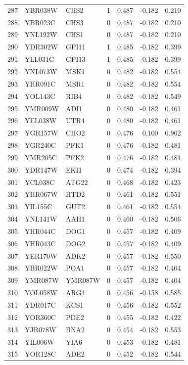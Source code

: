 \begin{longtable}{rllrrrr}
287 & YBR038W & CHS2 & 1 & 0.487 & -0.182 & 0.210\\
288 & YBR023C & CHS3 & 0 & 0.487 & -0.182 & 0.210\\
289 & YNL192W & CHS1 & 0 & 0.487 & -0.182 & 0.210\\
290 & YDR302W & GPI11 & 1 & 0.485 & -0.182 & 0.399\\
291 & YLL031C & GPI13 & 1 & 0.485 & -0.182 & 0.399\\
292 & YNL073W & MSK1 & 0 & 0.482 & -0.182 & 0.554\\
293 & YHR091C & MSR1 & 0 & 0.482 & -0.182 & 0.554\\
294 & YOL143C & RIB4 & 0 & 0.482 & -0.182 & 0.549\\
295 & YMR009W & ADI1 & 0 & 0.480 & -0.182 & 0.461\\
296 & YEL038W & UTR4 & 0 & 0.480 & -0.182 & 0.461\\
297 & YGR157W & CHO2 & 0 & 0.476 & 0.100 & 0.962\\
298 & YGR240C & PFK1 & 0 & 0.476 & -0.182 & 0.481\\
299 & YMR205C & PFK2 & 0 & 0.476 & -0.182 & 0.481\\
300 & YDR147W & EKI1 & 0 & 0.474 & -0.182 & 0.394\\
301 & YCL038C & ATG22 & 0 & 0.468 & -0.182 & 0.423\\
302 & YHR067W & HTD2 & 0 & 0.461 & -0.182 & 0.551\\
303 & YIL155C & GUT2 & 0 & 0.461 & -0.182 & 0.554\\
304 & YNL141W & AAH1 & 0 & 0.460 & -0.182 & 0.506\\
305 & YHR044C & DOG1 & 0 & 0.457 & -0.182 & 0.409\\
306 & YHR043C & DOG2 & 0 & 0.457 & -0.182 & 0.409\\
307 & YER170W & ADK2 & 0 & 0.457 & -0.182 & 0.550\\
308 & YBR022W & POA1 & 0 & 0.457 & -0.182 & 0.404\\
309 & YMR087W & YMR087W & 0 & 0.457 & -0.182 & 0.404\\
310 & YOL058W & ARG1 & 0 & 0.456 & -0.158 & 0.585\\
311 & YDR017C & KCS1 & 0 & 0.456 & -0.182 & 0.552\\
312 & YOR360C & PDE2 & 0 & 0.455 & -0.182 & 0.422\\
313 & YJR078W & BNA2 & 0 & 0.454 & -0.182 & 0.553\\
314 & YIL006W & YIA6 & 0 & 0.453 & -0.182 & 0.481\\
315 & YOR128C & ADE2 & 0 & 0.452 & -0.182 & 0.544\\

\end{longtable}
